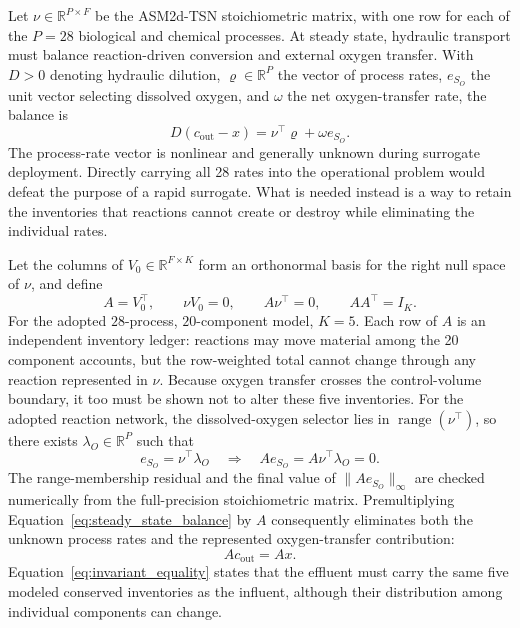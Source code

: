 \documentclass[a4paper,fleqn]{cas-sc}
\newcommand{\R}{\mathbb{R}}
\begin{document}
Let $\nu\in\R^{P\times F}$ be the ASM2d-TSN stoichiometric matrix, with one row for each of the $P=28$ biological and chemical processes. At steady state, hydraulic transport must balance reaction-driven conversion and external oxygen transfer. With $D>0$ denoting hydraulic dilution, $\varrho\in\R^P$ the vector of process rates, $e_{S_O}$ the unit vector selecting dissolved oxygen, and $\omega$ the net oxygen-transfer rate, the balance is
\begin{equation}
\label{eq:steady_state_balance}
D(c_{\mathrm{out}}-x)=\nu^\top\varrho+\omega e_{S_O}.
\end{equation}
The process-rate vector is nonlinear and generally unknown during surrogate deployment. Directly carrying all 28 rates into the operational problem would defeat the purpose of a rapid surrogate. What is needed instead is a way to retain the inventories that reactions cannot create or destroy while eliminating the individual rates.

Let the columns of $V_0\in\R^{F\times K}$ form an orthonormal basis for the right null space of $\nu$, and define
\begin{equation}
\label{eq:invariant_operator}
A=V_0^\top,
\qquad
\nu V_0=0,
\qquad
A\nu^\top=0,
\qquad
AA^\top=I_K.
\end{equation}
For the adopted $28$-process, $20$-component model, $K=5$. Each row of $A$ is an independent inventory ledger: reactions may move material among the 20 component accounts, but the row-weighted total cannot change through any reaction represented in $\nu$. Because oxygen transfer crosses the control-volume boundary, it too must be shown not to alter these five inventories. For the adopted reaction network, the dissolved-oxygen selector lies in $\operatorname{range}(\nu^\top)$, so there exists $\lambda_O\in\R^P$ such that
\begin{equation}
\label{eq:oxygen_invariant}
e_{S_O}=\nu^\top\lambda_O
\quad\Longrightarrow\quad
Ae_{S_O}=A\nu^\top\lambda_O=0.
\end{equation}
The range-membership residual and the final value of $\|Ae_{S_O}\|_\infty$ are checked numerically from the full-precision stoichiometric matrix. Premultiplying Equation~\eqref{eq:steady_state_balance} by $A$ consequently eliminates both the unknown process rates and the represented oxygen-transfer contribution:
\begin{equation}
\label{eq:invariant_equality}
Ac_{\mathrm{out}}=Ax.
\end{equation}
Equation~\eqref{eq:invariant_equality} states that the effluent must carry the same five modeled conserved inventories as the influent, although their distribution among individual components can change.
\end{document}
